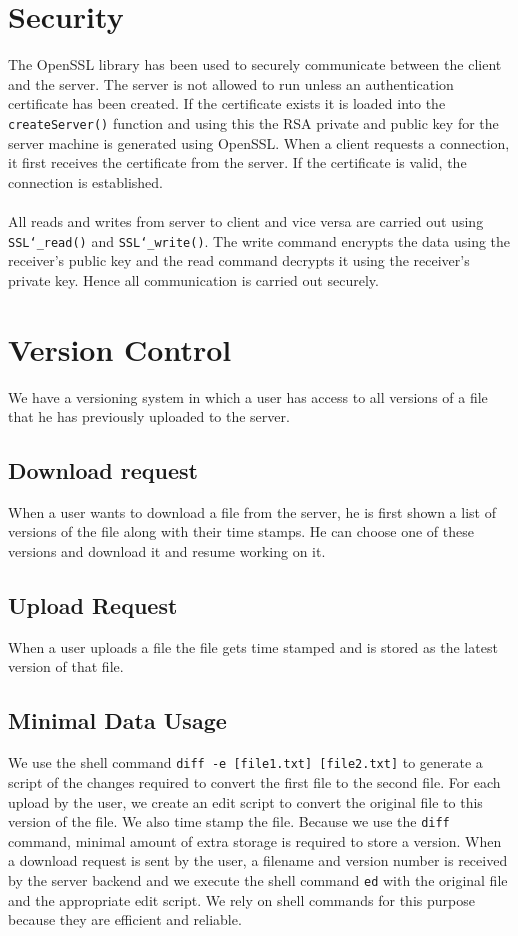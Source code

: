 \documentclass[]{article}
\newcommand{\ty}[1]{\texttt{#1}}
\begin{document}
\section{Security}
The OpenSSL library has been used to securely communicate between the client and the server. The server is not allowed to run unless an authentication certificate has been created. If the certificate exists it is loaded into the \ty{createServer()} function and using this the RSA private and public key for the server machine is generated using OpenSSL. When a client requests a connection, it first receives the certificate from the server. If the certificate is valid, the connection is established.\\ \\ All reads and writes from server to client and vice versa are carried out using \ty{SSL\char`_read()} and \ty{SSL\char`_write()}. The write command encrypts the data using the receiver's public key and the read command decrypts it using the receiver's private key. Hence all communication is carried out securely.
\section{Version Control}
We have a versioning system in which a user has access to all versions of a file that he has previously uploaded to the server.
\subsection{Download request} When a user wants to download a file from the server, he is first shown a list of versions of the file along with their time stamps. He can choose one of these versions and download it and resume working on it.
\subsection{Upload Request} When a user uploads a file the file gets time stamped and is stored as the latest version of that file.
\subsection{Minimal Data Usage}
We use the shell command \ty{diff -e [file1.txt] [file2.txt]} to generate a script of the changes required to convert the first file to the second file. For each upload by the user, we create an edit script to convert the original file to this version of the file. We also time stamp the file. Because we use the \ty{diff} command, minimal amount of extra storage is required to store a version. When a download request is sent by the user, a filename and version number is received by the server backend and we execute the shell command \ty{ed} with the original file and the appropriate edit script. We rely on shell commands for this purpose because they are efficient and reliable.
\end{document}
